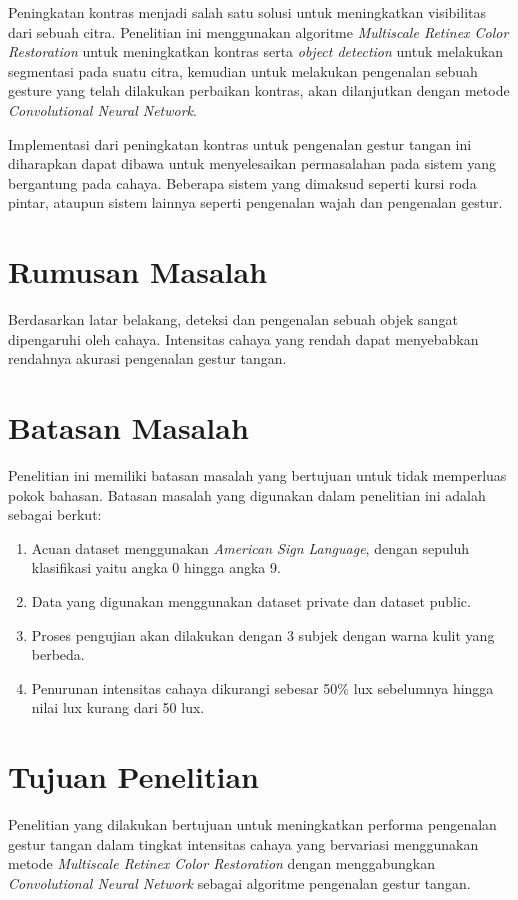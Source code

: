 Peningkatan kontras menjadi salah satu solusi untuk meningkatkan visibilitas dari sebuah citra. Penelitian ini menggunakan algoritme \emph{Multiscale Retinex Color Restoration} untuk meningkatkan kontras serta \emph{object detection} untuk melakukan segmentasi pada suatu citra, kemudian untuk melakukan pengenalan sebuah gesture yang telah dilakukan perbaikan kontras, akan dilanjutkan dengan metode \emph{Convolutional Neural Network}. 

Implementasi dari peningkatan kontras untuk pengenalan gestur tangan ini diharapkan dapat dibawa untuk menyelesaikan permasalahan pada sistem yang bergantung pada cahaya. Beberapa sistem yang dimaksud seperti kursi roda pintar, ataupun sistem lainnya seperti pengenalan wajah dan pengenalan gestur. 
\section{Rumusan Masalah}
Berdasarkan latar belakang, deteksi dan pengenalan sebuah objek sangat dipengaruhi oleh cahaya.
Intensitas cahaya yang rendah dapat menyebabkan rendahnya akurasi pengenalan gestur tangan.
\section{Batasan Masalah} 

Penelitian ini memiliki batasan masalah yang bertujuan untuk tidak memperluas pokok bahasan. Batasan masalah yang digunakan dalam penelitian ini adalah sebagai berkut:
\begin{enumerate}
\item Acuan dataset menggunakan \emph{American Sign Language}, dengan sepuluh klasifikasi yaitu angka 0 hingga angka 9.
\item Data yang digunakan menggunakan dataset private dan dataset public.
\item Proses pengujian akan dilakukan dengan 3 subjek dengan warna kulit yang berbeda.
\item Penurunan intensitas cahaya dikurangi sebesar 50\% lux sebelumnya hingga nilai lux kurang dari 50 lux.
\end{enumerate}
\section{Tujuan Penelitian}
Penelitian yang dilakukan bertujuan untuk meningkatkan performa pengenalan gestur tangan 
dalam tingkat intensitas cahaya yang bervariasi menggunakan metode \emph{Multiscale Retinex Color Restoration} dengan menggabungkan \emph{Convolutional Neural Network}
sebagai algoritme pengenalan gestur tangan.

